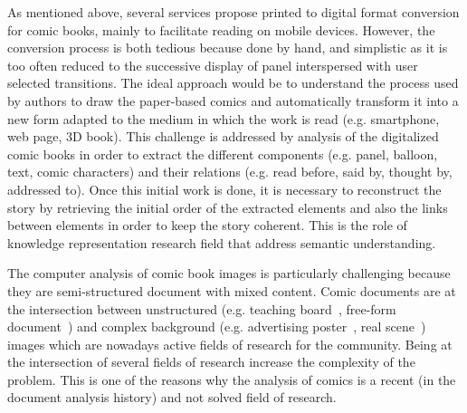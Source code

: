 
As mentioned above, several services propose printed to digital format conversion for comic books, mainly to facilitate reading on mobile devices.
However, the conversion process is both tedious because done by hand, and simplistic as it is too often reduced to the successive display of panel interspersed with user selected transitions.
The ideal approach would be to understand the process used by authors to draw the paper-based comics and automatically transform it into a new form adapted to the medium in which the work is read (e.g. smartphone, web page, 3D book). 
This challenge is addressed by analysis of the digitalized comic books in order to extract the different components (e.g. panel, balloon, text, comic characters) and their relations (e.g. read before, said by, thought by, addressed to).
Once this initial work is done, it is necessary to reconstruct the story by retrieving the initial order of the extracted elements and also the links between elements in order to keep the story coherent.
This is the role of knowledge representation research field that address semantic understanding.%



The computer analysis of comic book images is particularly challenging because they are semi-structured document with mixed content.
Comic documents are at the intersection between unstructured (e.g. teaching board~\cite{Oliveira10}, free-form document~\cite{Delaye2014Multi}) and complex background (e.g. advertising poster~\cite{Clavelli09}, real scene~\cite{Weinman09,Epshtein10,Neumann12}) images which are nowadays active fields of research for the community.
Being at the intersection of several fields of research increase the complexity of the problem.
This is one of the reasons why the analysis of comics is a recent (in the document analysis history) and not solved field of research.



